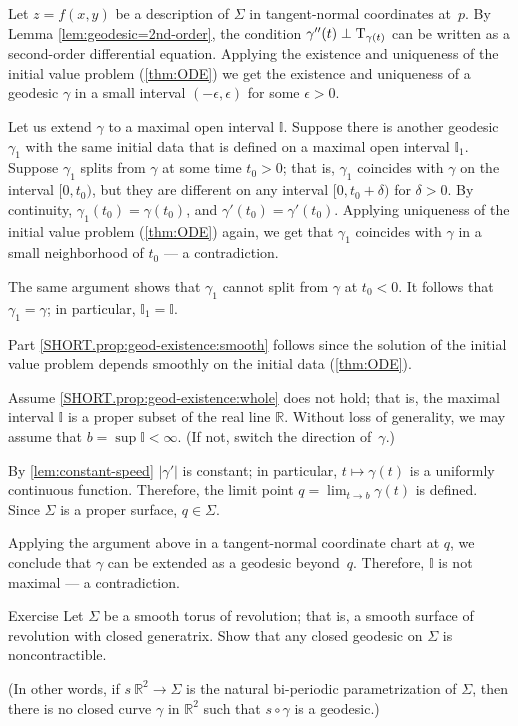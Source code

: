 Let $z=f(x,y)$ be a description of $\Sigma$ in tangent-normal coordinates at~$p$.
By Lemma \ref{lem:geodesic=2nd-order}, the condition $\gamma''(t)\perp\mathrm{T}_{\gamma(t)}$ can be written as a second-order differential equation.
Applying the existence and uniqueness of the initial value problem (\ref{thm:ODE}) we get the existence and uniqueness of a geodesic $\gamma$ in a small interval $(-\epsilon,\epsilon)$ for some $\epsilon>0$.

Let us extend $\gamma$ to a maximal open interval $\mathbb{I}$.
Suppose there is another geodesic $\gamma_1$ with the same initial data that is defined on a maximal open interval $\mathbb{I}_1$.
Suppose $\gamma_1$ splits from $\gamma$ at some time $t_0>0$;
that is, $\gamma_1$ coincides with $\gamma$ on the interval $[0,t_0)$, but they are different on any interval $[0,t_0+\delta)$ for $\delta>0$.
By continuity, $\gamma_1(t_0)=\gamma(t_0)$, and $\gamma'(t_0)=\gamma'(t_0)$.
Applying uniqueness of the initial value problem (\ref{thm:ODE}) again, we get that $\gamma_1$ coincides with $\gamma$ in a small neighborhood of $t_0$ --- a contradiction.

The same argument shows that $\gamma_1$ cannot split from $\gamma$ at $t_0<0$.
It follows that $\gamma_1=\gamma$;
in particular, $\mathbb{I}_1=\mathbb{I}$.

Part \ref{SHORT.prop:geod-existence:smooth} follows since the solution of the initial value problem depends smoothly on the initial data (\ref{thm:ODE}).

Assume \ref{SHORT.prop:geod-existence:whole} does not hold;
that is, the maximal interval $\mathbb{I}$ is a proper subset of the real line $\mathbb{R}$.
Without loss of generality, we may assume that $b=\sup\mathbb{I}<\infty$.
(If not, switch the direction of~$\gamma$.)

By \ref{lem:constant-speed} $|\gamma'|$ is constant; in particular, $t\mapsto \gamma(t)$ is a uniformly continuous function.
Therefore, the limit point
$q=\lim_{t\to b}\gamma(t)$
is defined.
Since $\Sigma$ is a proper surface, $q\in \Sigma$. 

Applying the argument above in a tangent-normal coordinate chart at $q$, we conclude that $\gamma$ can be extended as a geodesic beyond~$q$.
Therefore, $\mathbb{I}$ is not maximal --- a contradiction.
\qeds

\begin{thm}{Exercise}\label{ex:round-torus}
Let $\Sigma$ be a smooth torus of revolution; that is,
a smooth surface of revolution with closed generatrix.
Show that any closed geodesic on $\Sigma$ is noncontractible.

(In other words, if $s\:\mathbb{R}^2\to \Sigma$ is the natural bi-periodic parametrization of $\Sigma$, then
there is no closed curve $\gamma$ in $\mathbb{R}^2$ such that $s\circ\gamma$ is a geodesic.)
\end{thm}


